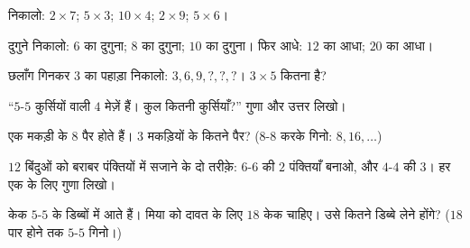 \begin{exercise}[$\star$]\label{exo:g2:mult:4}
निकालो: $2 \times 7$; \quad $5 \times 3$; \quad $10 \times 4$;
\quad $2 \times 9$; \quad $5 \times 6$।
\end{exercise}

\begin{exercise}[$\star$]\label{exo:g2:mult:5}
दुगुने निकालो: $6$ का दुगुना; $8$ का दुगुना; $10$ का दुगुना।
फिर आधे: $12$ का आधा; $20$ का आधा।
\end{exercise}

\begin{exercise}[$\star$]\label{exo:g2:mult:6}
छलाँग गिनकर $3$ का पहाड़ा निकालो: $3, 6, 9, ?, ?, ?$।
$3 \times 5$ कितना है?
\end{exercise}

\begin{exercise}[$\star$]\label{exo:g2:mult:7}
``$5$-$5$ कुर्सियों वाली $4$ मेज़ें हैं। कुल कितनी कुर्सियाँ?''
गुणा और उत्तर लिखो।
\end{exercise}

\begin{exercise}[$\star$]\label{exo:g2:mult:8}
एक मकड़ी के $8$ पैर होते हैं। $3$ मकड़ियों के कितने पैर? ($8$-$8$
करके गिनो: $8, 16, \dots$)
\end{exercise}

\begin{exercise}[$\star$]\label{exo:g2:mult:9}
$12$ बिंदुओं को बराबर पंक्तियों में सजाने के दो तरीक़े: $6$-$6$ की
$2$ पंक्तियाँ बनाओ, और $4$-$4$ की $3$। हर एक के लिए गुणा लिखो।
\end{exercise}

\begin{exercise}[$\star\star$]\label{exo:g2:mult:10}
केक $5$-$5$ के डिब्बों में आते हैं। मिया को दावत के लिए $18$ केक
चाहिए। उसे कितने डिब्बे लेने होंगे? ($18$ पार होने तक $5$-$5$ गिनो।)
\end{exercise}
